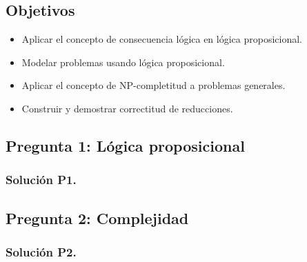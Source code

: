 \documentclass{article}
\begin{document}
\subsection*{Objetivos}
\begin{itemize}
    \item Aplicar el concepto de consecuencia lógica en lógica proposicional.
    \item Modelar problemas usando lógica proposicional.
    \item Aplicar el concepto de NP-completitud a problemas generales.
    \item Construir y demostrar correctitud de reducciones.
\end{itemize}

\subsection*{Pregunta 1: Lógica proposicional}

\subsubsection*{Solución P1.}

\newpage
\subsection*{Pregunta 2: Complejidad}

\subsubsection*{Solución P2.}

\end{document}
